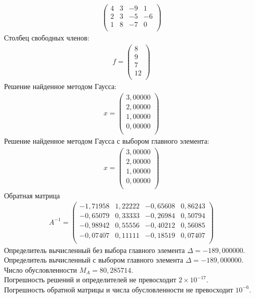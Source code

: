 \documentclass[a4paper,12pt,titlepage,finall]{article}
\begin{document}
\begin{enumerate}
\begin{align*}
\begin{pmatrix}
         4&           3&          -9&           1 \\
         2&           3&          -5&          -6 \\
         1&           8&          -7&           0 \\
\end{pmatrix}
\end{align*}
Столбец свободных членов:
\begin{align*}
f = \begin{pmatrix}
8 \\
         9 \\
         7 \\
        12 \\
\end{pmatrix}
\end{align*}
Решение найденное методом Гаусса:
\begin{align*}
x = \begin{pmatrix}
3,00000 \\
   2,00000 \\
   1,00000 \\
   0,00000 \\
\end{pmatrix}
\end{align*}
Решение найденное методом Гаусса с выбором главного элемента:
\begin{align*}
x = \begin{pmatrix}
3,00000 \\
   2,00000 \\
   1,00000 \\
   0,00000 \\
\end{pmatrix}
\end{align*}
Обратная матрица
\begin{align*}
A^{-1} = \begin{pmatrix}
  -1,71958&     1,22222&    -0,65608&     0,86243 \\
  -0,65079&     0,33333&    -0,26984&     0,50794 \\
  -0,98942&     0,55556&    -0,40212&     0,56085 \\
  -0,07407&     0,11111&    -0,18519&     0,07407 \\
\end{pmatrix}
\end{align*}
Определитель вычисленный без выбора главного элемента  $\Delta = -189,000000$.\\
Определитель вычисленный с выбором главного элемента $\Delta = -189,000000$.\\
Число обусловленности $M_A = 80,285714$.\\
Погрешность решений и определителей не превосходит $2 \times 10^{-17}$.\\
Погрешность обратной матрицы и числа обусловленности не превосходит $10^{-6}$.


\end{enumerate}
\end{document}
